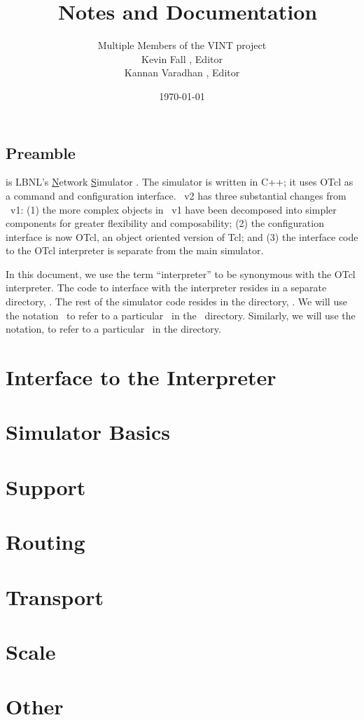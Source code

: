 \documentclass{report}
\title{\ns\ Notes and Documentation}
\author{Multiple Members of the VINT project\\
  Kevin Fall \tup{kfall@ee.lbl.gov}, Editor\\
  Kannan Varadhan \tup{kannan@catarina.usc.edu}, Editor}
\date{\today}
\begin{document}
\maketitle
\thispagestyle{empty}

\chapter{Preamble}

is LBNL's \underline{N}etwork \underline{S}imulator \cite{ns}.
The simulator is written in C++;
it uses OTcl as a command and configuration interface.
\ns~v2 has three substantial changes from \ns~v1:
(1) the more complex objects in \ns~v1
    have been decomposed into simpler components
    for greater flexibility and composability;
(2) the configuration interface is now OTcl, 
    an object oriented version of Tcl; and
(3) the interface code to the OTcl interpreter is
    separate from the main simulator.

In this document,
we use the term ``interpreter''
to be synonymous with the OTcl interpreter.
The code to interface with the interpreter resides
in a separate directory, .
The rest of the simulator code resides in the directory, .
We will use the notation \
to refer to a particular \ in the
\ directory.
Similarly, we will use the notation, 
to refer to a particular \tup{file}\ in the  directory.

\tableofcontents

\part{Interface to the Interpreter}


\part{Simulator Basics}






\part{Support}



\part{Routing}




\part{Transport}



\part{Scale}


\part{Other}

\end{document}

